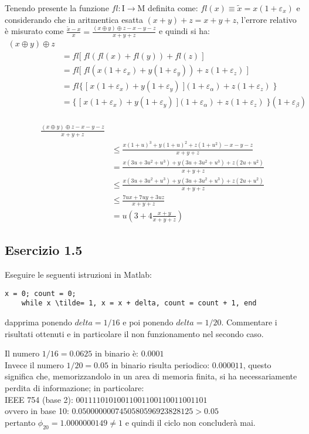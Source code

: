 Tenendo presente la funzione $fl: \mathrm{I} \rightarrow \mathrm{M}$ definita come: $fl(x) \equiv \tilde{x} = x(1+\varepsilon_x)$ e considerando che in aritmentica esatta $(x+y)+z = x+y+z$, l'errore relativo è misurato come $\frac{\tilde{x}-x}{x} = \frac{(x \oplus y) \oplus z - x - y - z}{x+y+z}$ e quindi si ha:
\begin{equation*}
	\begin{split}
		(x \oplus y) \oplus z \\
			& = fl \lbrack \; fl(fl(x) + fl(y)) + fl(z) \;\rbrack \\
			& = fl \lbrack \; fl(x(1+\varepsilon_x) + y(1+\varepsilon_y)) + z(1+\varepsilon_z) \; \rbrack \\
			& = fl \{ \; \lbrack \; x(1+\varepsilon_x) + y(1+\varepsilon_y) \; \rbrack (1 + \varepsilon_{\alpha}) + z(1+\varepsilon_z) \; \} \\
	  		& = \{ \; \lbrack \; x(1+\varepsilon_x) + y(1+\varepsilon_y) \; \rbrack (1 + \varepsilon_{\alpha}) + z(1+\varepsilon_z) \; \} (1 + \varepsilon_{\beta}) \\
	\end{split}
\end{equation*}

\begin{equation*}
	\begin{split}
		\frac{(x \oplus y) \oplus z - x - y - z}{x+y+z} \\
			& \leq \frac{x(1+u)^3 + y(1+u)^2 + z(1+u^2) -x -y -z}{x+y+z} \\
	 		& = \frac{x(3u+3u^2+u^3) + y(3u+3u^2+u^3) + z(2u+u^2)}{x+y+z} \\
	 		& \leq \frac{x(3u+3u^2+u^3) + y(3u+3u^2+u^3) + z(2u+u^2)}{x+y+z} \\
	 		& \leq \frac{7ux+7uy+3uz}{x+y+z} \\
	 		& = u(3+4 \frac{x+y}{x+y+z})
	\end{split}
\end{equation*}


	\subsection{Esercizio 1.5}
Eseguire le seguenti istruzioni in Matlab:
\begin{lstlisting}[frame=single]
	x = 0; count = 0;	
	while x \tilde= 1, x = x + delta, count = count + 1, end
\end{lstlisting}
dapprima ponendo $delta = 1/16$ e poi ponendo $delta = 1/20$. Commentare i risultati ottenuti e in particolare il non funzionamento nel secondo caso.
\par
Il numero $1/16 = 0.0625$ in binario è: $0.0001$\\
Invece il numero $1/20 = 0.05$ in binario risulta periodico: $0.00\underline{0011}$, questo significa che, memorizzandolo in un area di memoria finita, si ha necessariamente perdita di informazione; in particolare:\\
IEEE 754 (base 2): $00111101010011001100110011001101$\\
ovvero in base 10: $0.0500000007450580596923828125 > 0.05$\\
pertanto $\phi_{20} = 1.0000000149 \neq 1$ e quindi il ciclo non concluderà mai.

